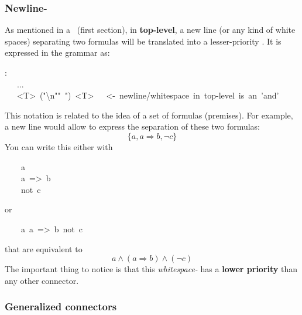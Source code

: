\subsubsection{Newline-}\label{newline}%

\noindent As mentioned in a~ (first section), in \textbf{top-level}, a
new line (or any kind of white spaces) separating two formulas will be
translated into a lesser-priority . It is expressed in the grammar as:%
\begin{mdpre}%
:\\
~~\textbar{}~...\\
~~\textbar{}~{\textless{}T\textgreater{}}~("\textbackslash{}n"\textbar{}"~")~{\textless{}T\textgreater{}}~~~{\textless{}-~newline/whitespace~in~top-level~is~an~'and'}%
\end{mdpre}\noindent This notation is related to the idea of a set of formulas (premises). For
example, a new line would allow to express the separation of these two
formulas:
\noindent\noindent\[  \{a, a \Rightarrow b, \neg c\}
\]%
\noindent You can write this either with
\begin{mdpre}%
\noindent~~~~a\\
~~~~a~=\textgreater{}~b\\
~~~~not~c%
\end{mdpre}\noindent or
\begin{mdpre}%
\noindent~~~~a~a~=\textgreater{}~b~not~c%
\end{mdpre}\noindent that are equivalent to
\noindent\noindent\[  a \wedge (a \Rightarrow b) \wedge (\neg c)
\]%
\noindent The important thing to notice is that this \emph{whitespace-} has a
\textbf{lower priority} than any other connector.

\subsubsection{Generalized connectors}\label{sec-generalized-connectors}%

